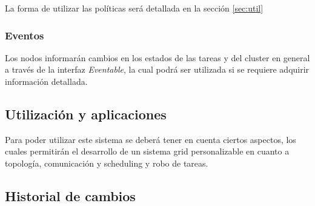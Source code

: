 \documentclass[12pt,a4paper,oneside,spanish]{report}
\begin{document}
La forma de utilizar las políticas será detallada en la sección \ref{sec:util}

\subsubsection*{Eventos}

Los nodos informarán cambios en los estados de las tareas y del cluster en general a través de la interfaz \textit{Eventable}, la cual podrá ser utilizada si se requiere adquirir información detallada.


\subsection*{Utilización y aplicaciones}
\label{sec:util}

Para poder utilizar este sistema se deberá tener en cuenta ciertos aspectos, los cuales permitirán el desarrollo de un sistema grid personalizable en cuanto a topología, comunicación y scheduling y robo de tareas.


\subsection*{Historial de cambios}%
\end{document}
